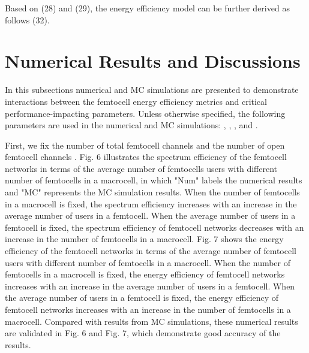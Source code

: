 \documentclass[10pt,final,journal,letterpaper,twoside,twocolumn]{IEEEtran}
\begin{document}
Based on (28) and (29), the energy efficiency model can be further derived as
follows (32).

\section{Numerical Results and Discussions}
\label{sec5}

In this subsections numerical and MC simulations are presented to demonstrate interactions
between the femtocell energy efficiency metrics and critical performance-impacting parameters. Unless otherwise specified, the following parameters are used in the numerical and MC simulations: ,
,  , and  .

First, we fix the number of total femtocell channels  and the number of open femtocell channels . Fig. 6 illustrates the spectrum efficiency of the femtocell networks in terms of the average number of femtocells users with different number of femtocells in a
macrocell, in which "Num" labels the numerical results and "MC" represents the MC simulation results. When the number of femtocells in a macrocell is fixed, the
spectrum efficiency increases with an increase in the average number of users in a femtocell. When the average number
of users in a femtocell is fixed, the spectrum efficiency of femtocell
networks decreases with an increase in the number of femtocells in a macrocell. Fig. 7 shows the
energy efficiency of the femtocell networks in terms of the average number of
femtocell users with different number of femtocells in a macrocell. When the
number of femtocells in a macrocell is fixed, the energy efficiency of
femtocell networks increases with an increase in the average number of users in a femtocell. When the average number
of users in a femtocell is fixed, the energy efficiency of femtocell networks
increases with an increase in the number of femtocells in a macrocell. Compared with results from MC simulations, these numerical results are validated in Fig. 6 and Fig. 7, which demonstrate good accuracy of the results.
\end{document}
